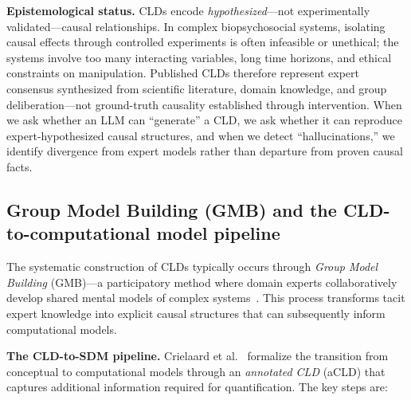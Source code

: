 \medskip
\noindent
\textbf{Epistemological status.} CLDs encode \emph{hypothesized}---not experimentally validated---causal relationships. In complex biopsychosocial systems, isolating causal effects through controlled experiments is often infeasible or unethical; the systems involve too many interacting variables, long time horizons, and ethical constraints on manipulation. Published CLDs therefore represent expert consensus synthesized from scientific literature, domain knowledge, and group deliberation---not ground-truth causality established through intervention. When we ask whether an LLM can ``generate'' a CLD, we ask whether it can reproduce expert-hypothesized causal structures, and when we detect ``hallucinations,'' we identify divergence from expert models rather than departure from proven causal facts.

\subsection{Group Model Building (GMB) and the CLD-to-computational model pipeline}
\label{sec:background_gmb}

The systematic construction of CLDs typically occurs through \emph{Group Model Building} (GMB)---a participatory method where domain experts collaboratively develop shared mental models of complex systems~\cite{crielaard2024refining}. This process transforms tacit expert knowledge into explicit causal structures that can subsequently inform computational models.

\medskip
\noindent
\textbf{The CLD-to-SDM pipeline.} Crielaard et al.~\cite{crielaard2024refining} formalize the transition from conceptual to computational models through an \emph{annotated CLD} (aCLD) that captures additional information required for quantification. The key steps are:

